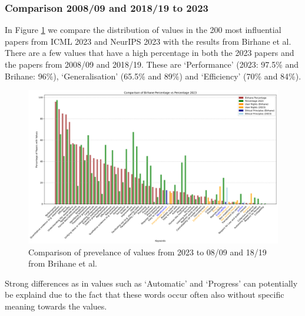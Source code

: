 \documentclass{article}
\begin{document}
\subsubsection{Comparison 2008/09 and 2018/19 to 2023}
In Figure \ref{fig:percentage_comparison_years} we compare the distribution of values in the 200 most influential papers from ICML 2023 and NeurIPS 2023 with the results from Birhane et al.
There are a few values that have a high percentage in both the 2023 papers and the papers from 2008/09 and 2018/19. 
These are `Performance' (2023: 97.5\% and Brihane: 96\%), `Generalisation' (65.5\% and 89\%) and `Efficiency' (70\% and 84\%). 
\begin{figure}[H]
    \centering
    \includegraphics[width=\textwidth]{../plots/percentage_comparison_brihane.png}
    \caption{Comparison of prevelance of values from 2023 to 08/09 and 18/19 from Brihane et al.}
    \label{fig:percentage_comparison_years}
\end{figure}
Strong differences as in values such as `Automatic' and `Progress' can potentially be explaind due to the fact that these 
words occur often also without specific meaning towards the values. 
\end{document}
